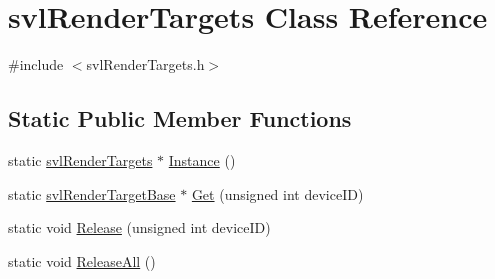 \hypertarget{classsvl_render_targets}{\section{svl\-Render\-Targets Class Reference}
\label{classsvl_render_targets}
}


{\ttfamily \#include $<$svl\-Render\-Targets.\-h$>$}

\subsection*{Static Public Member Functions}
\begin{DoxyCompactItemize}
\item 
static \hyperlink{classsvl_render_targets}{svl\-Render\-Targets} $\ast$ \hyperlink{classsvl_render_targets_a3a50b34c113f8c8c46f4c2283b71ecac}{Instance} ()
\item 
static \hyperlink{classsvl_render_target_base}{svl\-Render\-Target\-Base} $\ast$ \hyperlink{classsvl_render_targets_a6a7bc2bdb2bbe9c259b9fb94c696a602}{Get} (unsigned int device\-I\-D)
\item 
static void \hyperlink{classsvl_render_targets_a54bf2d1cdab77b6f7ef3aa105f86bf62}{Release} (unsigned int device\-I\-D)
\item 
static void \hyperlink{classsvl_render_targets_a070529d8f78256b3187b820499cd2b47}{Release\-All} ()
\end{DoxyCompactItemize}


